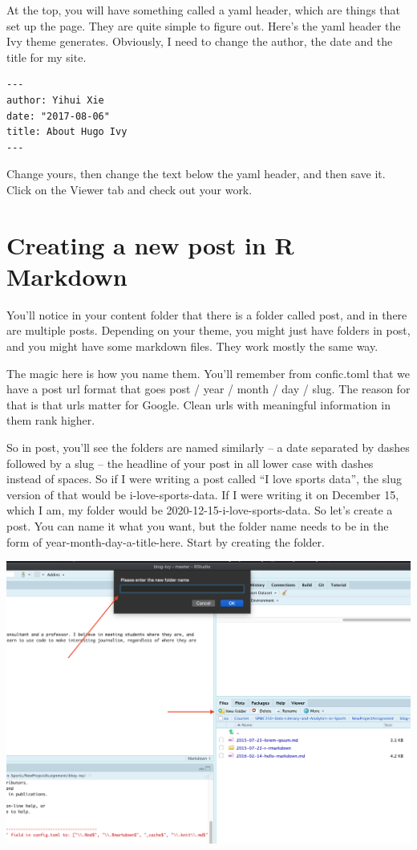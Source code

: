 \documentclass[
]{book}
\begin{document}
At the top, you will have something called a yaml header, which are things that set up the page. They are quite simple to figure out. Here's the yaml header the Ivy theme generates. Obviously, I need to change the author, the date and the title for my site.

\begin{verbatim}
---
author: Yihui Xie
date: "2017-08-06"
title: About Hugo Ivy
---
\end{verbatim}

Change yours, then change the text below the yaml header, and then save it. Click on the Viewer tab and check out your work.

\hypertarget{creating-a-new-post-in-r-markdown}{%
\section{Creating a new post in R Markdown}\label{creating-a-new-post-in-r-markdown}}

You'll notice in your content folder that there is a folder called post, and in there are multiple posts. Depending on your theme, you might just have folders in post, and you might have some markdown files. They work mostly the same way.

The magic here is how you name them. You'll remember from confic.toml that we have a post url format that goes post / year / month / day / slug. The reason for that is that urls matter for Google. Clean urls with meaningful information in them rank higher.

So in post, you'll see the folders are named similarly -- a date separated by dashes followed by a slug -- the headline of your post in all lower case with dashes instead of spaces. So if I were writing a post called ``I love sports data'', the slug version of that would be i-love-sports-data. If I were writing it on December 15, which I am, my folder would be 2020-12-15-i-love-sports-data.
So let's create a post. You can name it what you want, but the folder name needs to be in the form of year-month-day-a-title-here. Start by creating the folder.

\includegraphics[width=32.83in]{images/blog6}
\end{document}
